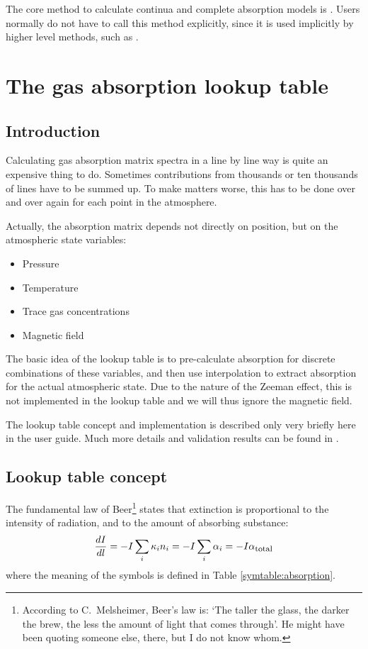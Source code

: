 The core method to calculate continua and complete absorption models
is .  Users normally do not
have to call this method explicitly, since it is used implicitly by
higher level methods, such as .


\section{The gas absorption lookup table}
\label{sec:absorption:lookup}

\subsection{Introduction}

Calculating gas absorption matrix spectra in a line by line way
is quite an expensive thing to do. Sometimes contributions from
thousands or ten thousands of lines have to be summed up. To make
matters worse, this has to be done over and over again for each point
in the atmosphere.

Actually, the absorption matrix depends not directly on position,
but on the atmospheric state variables:
\begin{itemize}
\item Pressure
\item Temperature
\item Trace gas concentrations
\item Magnetic field
\end{itemize}

The basic idea of the lookup table is to pre-calculate absorption for
discrete combinations of these variables, and then use interpolation
to extract absorption for the actual atmospheric state. Due to the nature of
the Zeeman effect, this is not implemented in the lookup table and we will 
thus ignore the magnetic field.

The lookup table concept and implementation is described only very
briefly here in the user guide. Much more details and validation
results can be found in \citet{buehler:absor:11}.

\subsection{Lookup table concept}

The fundamental law of Beer\footnote{According to C.\ Melsheimer,
  Beer's law is: `The taller the glass, the darker the brew, the less
  the amount of light that comes through'. He might have been quoting
  someone else, there, but I do not know whom.} states that extinction
is proportional to the intensity of radiation, and to the amount of
absorbing substance:
\begin{equation}
  \label{eq:lookup:beer}
  \frac{d I}{d l}
  =
  - I \sum_i {\kappa}_{i} {n}_{i}
  =
  - I \sum_i {\alpha}_{i}
  =
  - I {\alpha}_{\mbox{\footnotesize total}}
\end{equation}
where the meaning of the symbols is defined in Table
\ref{symtable:absorption}. 

